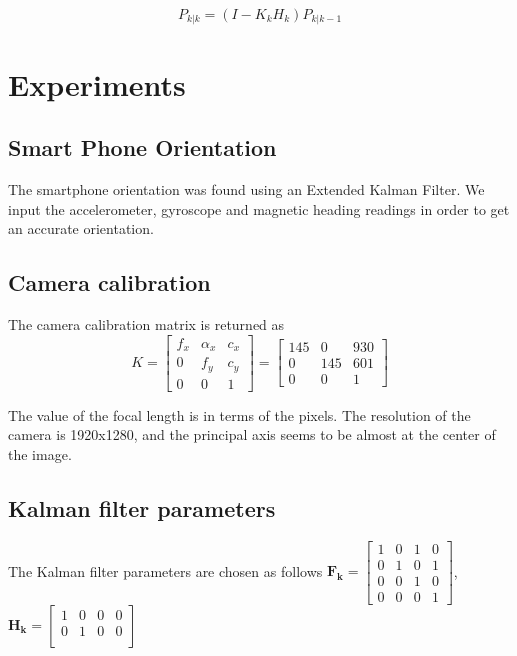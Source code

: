 \documentclass[12pt,twocolumn,letterpaper]{article}
\begin{document}
\begin{equation}
P_{k|k} = (I - K_kH_k)P_{k|k-1}
\label{eqn:ekf-updateCov}
\end{equation}

\section{Experiments}
\subsection{Smart Phone Orientation}
The smartphone orientation was found using an Extended Kalman Filter.  We input the accelerometer, gyroscope and magnetic heading readings in order to get an accurate orientation.

\subsection{Camera calibration}
The camera calibration matrix is returned as
\begin{equation}
K = \begin{bmatrix}
f_x & \alpha_x & c_x\\
0 & f_y &  c_y\\
0 & 0 & 1
\end{bmatrix} = \begin{bmatrix}
145 & 0 & 930\\
 0 &145 & 601\\
0 & 0 & 1
\end{bmatrix}
\end{equation}

The value of the focal length is in terms of the pixels. The resolution of the camera is 1920x1280, and the principal axis seems to be almost at the center of the image.

\subsection{Kalman filter parameters}
The Kalman filter parameters are chosen as follows
$ \mathbf{F_k} = \begin{bmatrix}
1 & 0 & 1 & 0\\
0 & 1 & 0 & 1\\
0 & 0 & 1 & 0\\
0 & 0 & 0 & 1
\end{bmatrix} $,
$ \mathbf{H_k} = \begin{bmatrix}
1 & 0 & 0 & 0\\
0 & 1 & 0 & 0\\
\end{bmatrix} $
\end{document}
